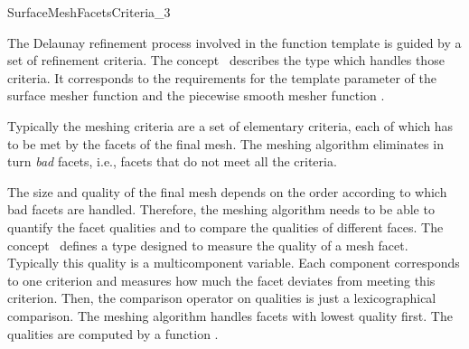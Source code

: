 

\begin{ccRefConcept}{SurfaceMeshFacetsCriteria_3}

\ccDefinition
  
The Delaunay refinement process involved in  the 
function template  
is guided by a set of refinement criteria.
The concept \ccRefName\ describes the type  which
handles those criteria. 
It corresponds to the requirements for the template parameter
 of the surface mesher function
 and the
piecewise smooth mesher
function .

Typically the meshing criteria are a set
of elementary criteria, each of which
has to be met by  the facets of the final mesh.
The meshing algorithm eliminates in turn  {\em bad} facets, i.e.,
facets that do not meet all the criteria.

The size and quality of the final mesh 
depends on the order according to which bad facets
are handled. Therefore, the meshing algorithm 
needs to be able to quantify the facet qualities and to compare
the qualities of different faces.
The concept \ccRefName\ 
defines a type  designed to measure
the quality of a mesh facet. 
Typically this quality
is a multicomponent variable.  Each component corresponds to
one criterion and measures how much the facet deviates from
meeting this criterion. Then, the  comparison operator on qualities
is just a lexicographical comparison. The meshing algorithm handles facets
with lowest quality first. The qualities are computed by a function
\ccc{is_bad(Facet f, Quality& q)}.

\ccTypes



\end{ccRefConcept}
